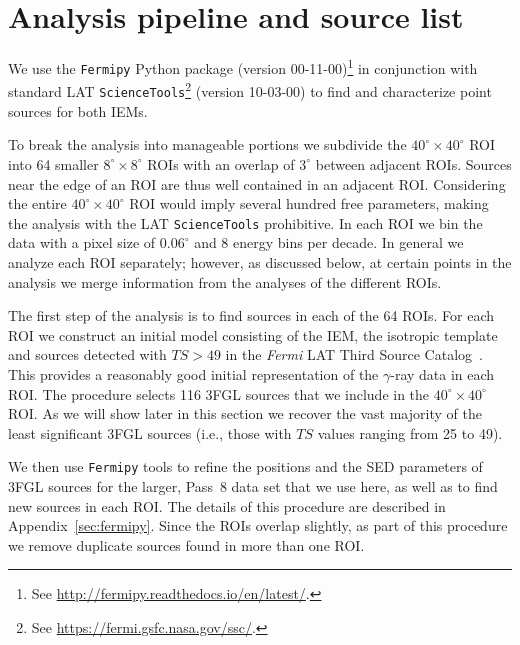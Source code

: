 \documentclass[iop]{emulateapj}
\newcommand{\fermipy}{\texttt{Fermipy}\xspace}
\begin{document}

\section{Analysis pipeline and source list}
\label{sec:sourcelist}
We use the \fermipy Python package (version 00-11-00)\footnote[5]{See
  \url{http://fermipy.readthedocs.io/en/latest/}.} in conjunction
with standard LAT \texttt{ScienceTools}\footnote[6]{See
  \url{https://fermi.gsfc.nasa.gov/ssc/}.} (version 10-03-00)
to find and characterize point
sources for both IEMs.

To break the analysis into manageable portions we subdivide
the $40^{\circ}\times40^{\circ}$ ROI into 64 smaller
$8^{\circ}\times8^{\circ}$ ROIs with an overlap of $3^{\circ}$ between
adjacent ROIs.  Sources near the edge of an ROI are thus well
contained in an adjacent ROI.  Considering the entire
$40^{\circ}\times40^{\circ}$ ROI would imply several hundred free
parameters, making the analysis with the LAT \texttt{ScienceTools}
prohibitive.  In each ROI we bin the data with a pixel size of
$0.06^{\circ}$ and 8 energy bins per decade.  In general we analyze
each ROI separately; however, as discussed below, at certain points in
the analysis we merge information from the analyses of the different
ROIs.

The first step of the analysis is to find sources in each of the 64
ROIs.  For each ROI we construct an initial model consisting of the
IEM, the isotropic template and sources detected with $TS>49$ in the
{\it Fermi} LAT Third Source Catalog~\citep[3FGL,][]{2015ApJS..218...23A}.
This provides a reasonably good initial representation of the
$\gamma$-ray data in each ROI.  The procedure selects 116 3FGL sources that we
include in the $40^{\circ}\times40^{\circ}$ ROI.  As we will show
later in this section we recover the vast majority of the least significant 3FGL
sources (i.e., those with $TS$ values ranging from 25 to 49).

We then use \fermipy tools to refine the positions and the SED
parameters of 3FGL sources for the larger, Pass~8 data set that we use
here, as well as to find new sources in each ROI.  The details of this
procedure are described in Appendix~\ref{sec:fermipy}.  Since the ROIs
overlap slightly, as part of this procedure we remove duplicate
sources found in more than one ROI.  
\end{document}
